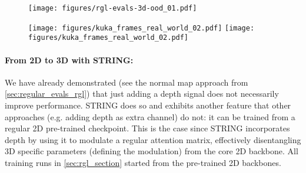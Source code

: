 \begin{figure}[h]
\centering
\texttt{[image: figures/rgl-evals-3d-ood\_01.pdf]}%
\vspace{-3mm}
\label{fig:kuka-real-world-ood-evals}
\end{figure}


\begin{figure}[h]
\centering
\texttt{[image: figures/kuka\_frames\_real\_world\_02.pdf]}%
\texttt{[image: figures/kuka\_frames\_real\_world\_02.pdf]}
\vspace{-6mm}
\label{fig:kuka-real-world}
\end{figure}

\paragraph{From 2D to 3D with STRING:}
We have already demonstrated (see the normal map approach from \cref{sec:regular_evals_rgl}) that just adding a depth signal does not necessarily improve performance.
STRING does so and exhibits another feature that other approaches (e.g. adding depth as extra channel) do not: it can be trained from a regular 2D pre-trained checkpoint. This is the case since STRING incorporates depth by using it to modulate a regular attention matrix, effectively disentangling 3D specific parameters (defining the modulation) from the core 2D backbone. All training runs in \cref{sec:rgl_section} started from the pre-trained 2D backbones.
